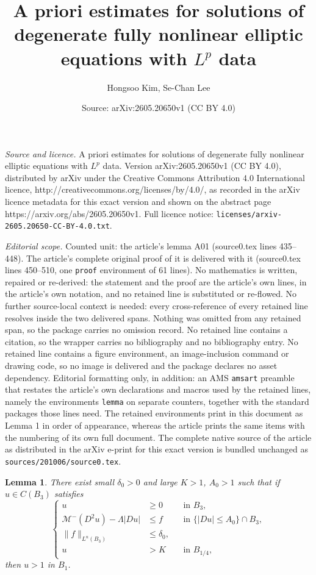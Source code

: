 \documentclass[10pt,a4paper]{amsart}
\title{A priori estimates for solutions of degenerate fully nonlinear elliptic equations with $L^p$ data}
\author{Hongsoo Kim, Se-Chan Lee}
\date{Source: arXiv:2605.20650v1 (CC BY 4.0)}
\newtheorem{lemma}{Lemma}
\begin{document}
\maketitle

\noindent\emph{Source and licence.} A priori estimates for solutions of degenerate fully nonlinear elliptic equations with $L^p$ data. Version arXiv:2605.20650v1 (CC BY 4.0), distributed by arXiv under the Creative Commons Attribution 4.0 International licence, http://creativecommons.org/licenses/by/4.0/, as recorded in the arXiv licence metadata for this exact version and shown on the abstract page https://arxiv.org/abs/2605.20650v1. Full licence notice: \texttt{licenses/arxiv-2605.20650-CC-BY-4.0.txt}.\par\smallskip

\noindent\textit{Editorial scope.} Counted unit: the article's lemma A01 (source0.tex lines 435--448). The article's complete original proof of it is delivered with it (source0.tex lines 450--510, one \texttt{proof} environment of 61 lines). No mathematics is written, repaired or re-derived: the statement and the proof are the article's own lines, in the article's own notation, and no retained line is substituted or re-flowed.  No further source-local context is needed: every cross-reference of every retained line resolves inside the two delivered spans.  Nothing was omitted from any retained span, so the package carries no omission record.  No retained line contains a citation, so the wrapper carries no bibliography and no bibliography entry.  No retained line contains a figure environment, an image-inclusion command or drawing code, so no image is delivered and the package declares no asset dependency.  Editorial formatting only, in addition: an AMS \texttt{amsart} preamble that restates the article's own declarations and macros used by the retained lines, namely the environments \texttt{lemma} on separate counters, together with the standard packages those lines need.  The retained environments print in this document as Lemma 1 in order of appearance, whereas the article prints the same items with the numbering of its own full document.  The complete native source of the article as distributed in the arXiv e-print for this exact version is bundled unchanged as \texttt{sources/201006/source0.tex}.
\begin{lemma}\label{A01}
    There exist small $\delta_0>0$ and large $K>1$, $A_0>1$ such that if  $u \in C(B_3)$ satisfies
    \begin{equation*}
    \left\{
    \begin{aligned}
        u &\geq 0 &&\text{in } B_3,\\
        \mathcal{M}^-(D^2u)-\Lambda|Du| &\leq f &&\text{in } \{|Du| \leq A_0\}\cap B_3, \\
        \|f\|_{L^n(B_3)} &\leq \delta_0, \\
        u&>K &&\text{in } B_{1/4},
    \end{aligned}
    \right.
    \end{equation*}
    then $u>1$ in $B_1$.
\end{lemma} 
\end{document}
